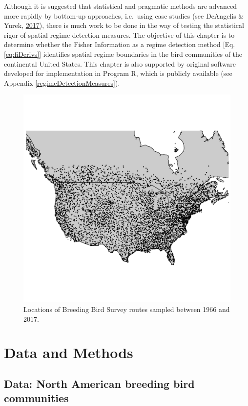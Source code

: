 \documentclass[print]{nuthesis}
\begin{document}
Although it is suggested that statistical and pragmatic methods are advanced more rapidly by bottom-up approaches, i.e.~using case studies (see DeAngelis \& Yurek, \protect\hyperlink{ref-deangelis2017spatially}{2017}), there is much work to be done in the way of testing the statistical rigor of spatial regime detection measures. The objective of this chapter is to determine whether the Fisher Information as a regime detection method {[}Eq. \eqref{eq:fiDerivs}{]} identifies spatial regime boundaries in the bird communities of the continental United States. This chapter is also supported by original software developed for implementation in Program R, which is publicly available (see Appendix \ref{regimeDetectionMeasures}).
\begin{figure}
\includegraphics[width=0.85\linewidth]{./chapterFiles/fisherSpatial/figures/figsCalledInDiss/bbsRoutesUsed} \caption{Locations of Breeding Bird Survey routes sampled between 1966 and 2017.}\label{fig:bbsPoints}
\end{figure}
\hypertarget{data-and-methods}{%
\section{Data and Methods}\label{data-and-methods}}

\hypertarget{data-north-american-breeding-bird-communities}{%
\subsection{Data: North American breeding bird communities}\label{data-north-american-breeding-bird-communities}}
\end{document}
